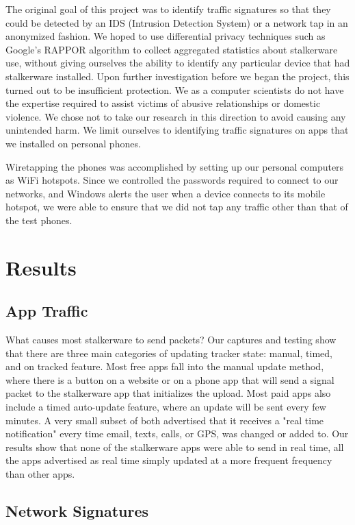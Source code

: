 \documentclass[acmtog]{acmart}
\begin{document}
The original goal of this project was to identify traffic signatures so that 
they could be detected by an IDS (Intrusion Detection System) or a network 
tap in an anonymized fashion. We hoped to use differential privacy techniques 
such as Google's RAPPOR algorithm \cite{erlingsson_rappor:_2014} to collect 
aggregated statistics about stalkerware use, without giving ourselves the 
ability to identify any particular device that had stalkerware installed. Upon 
further investigation before we began the project, this turned out to be 
insufficient protection. We as a computer 
scientists do not have the expertise required to assist victims of abusive 
relationships or domestic violence. We chose not to take our research in this 
direction to avoid causing any unintended harm. We limit ourselves to 
identifying traffic signatures on apps that we installed on personal phones.

Wiretapping the phones was accomplished by setting up our personal computers as 
WiFi hotspots. Since we controlled the passwords required to connect to our 
networks, and Windows alerts the user when a device connects to its mobile 
hotspot, we were able to ensure that we did not tap any traffic other than that 
of the test phones. 
\section{Results}
\subsection{App Traffic}

What causes most stalkerware to send packets? Our captures and testing show 
that there are three main categories of updating tracker state: manual, timed, 
and on tracked feature. Most free apps fall into the manual update method, 
where there is a button on a website or on a phone app that will send a signal 
packet to the stalkerware app that initializes the upload. Most paid apps also 
include a timed auto-update feature, where an update will be sent every few 
minutes. A very small subset of both advertised that it receives a "real time 
notification" every time email, texts, calls, or GPS, was changed or added to. 
Our results show that none of the stalkerware apps were able to send in real 
time, all the apps advertised as real time simply updated at a more frequent 
frequency than other apps.
\subsection{Network Signatures}
\label{network_signatures}
\end{document}
